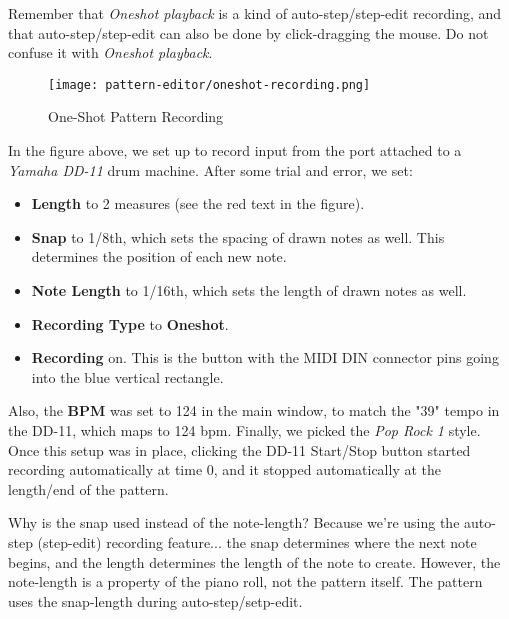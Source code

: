    Remember that \textsl{Oneshot playback} is a kind of auto-step/step-edit
   recording, and that auto-step/step-edit can also be done by click-dragging
   the mouse.  Do not confuse it with \textsl{Oneshot playback}.

\begin{figure}[H]
   \centering 
   \texttt{[image: pattern-editor/oneshot-recording.png]}
   \caption{One-Shot Pattern Recording}
   \label{fig:pattern_editor_oneshot_recording}
\end{figure}

   In the figure above, we set up to record input from the port attached to a
   \textsl{Yamaha DD-11} drum machine.  After some trial and error,
   we set:

   \begin{itemize}
      \item \textbf{Length} to 2 measures (see the red text in the figure).
      \item \textbf{Snap} to 1/8th, which sets the spacing of drawn notes as
         well.  This determines the position of each new note.
      \item \textbf{Note Length} to 1/16th, which sets the length of drawn
         notes as well.
      \item \textbf{Recording Type} to \textbf{Oneshot}.
      \item \textbf{Recording} on. This is the button with the MIDI DIN
         connector pins going into the blue vertical rectangle.
   \end{itemize}

   Also, the \textbf{BPM} was set to 124 in the main
   window, to match the "39" tempo in the DD-11, which maps to 124 bpm.
   Finally, we picked the \textsl{Pop Rock 1} style.  
   Once this setup was in place, clicking the DD-11 Start/Stop button started
   recording automatically at time 0, and it stopped automatically at the
   length/end of the pattern.

   Why is the snap used instead of the note-length?  Because we're using the
   auto-step (step-edit) recording feature...
   the snap determines where the next note
   begins, and the length determines the length of the note to create.
   However, the note-length is a property of the piano roll, not the pattern
   itself.  The pattern uses the snap-length during auto-step/setp-edit.

